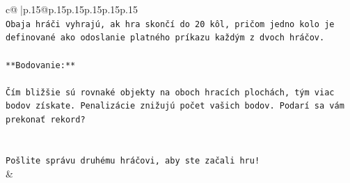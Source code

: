 \documentclass{article}
\begin{document}
{\begin{supertabular}{c@{$\;$}|p{.15\linewidth}@{}p{.15\linewidth}p{.15\linewidth}p{.15\linewidth}p{.15\linewidth}p{.15\linewidth}}
{{{\\ 
\texttt{Obaja hráči vyhrajú, ak hra skončí do 20 kôl, pričom jedno kolo je definované ako odoslanie platného príkazu každým z dvoch hráčov.} \\
\\ 
\texttt{**Bodovanie:**} \\
\\ 
\texttt{Čím bližšie sú rovnaké objekty na oboch hracích plochách, tým viac bodov získate. Penalizácie znižujú počet vašich bodov. Podarí sa vám prekonať rekord?} \\
\\ 
\\ 
\texttt{Pošlite správu druhému hráčovi, aby ste začali hru!} \\
            }
        }
    }
    & \\ \\


\end{supertabular}}
\end{document}
